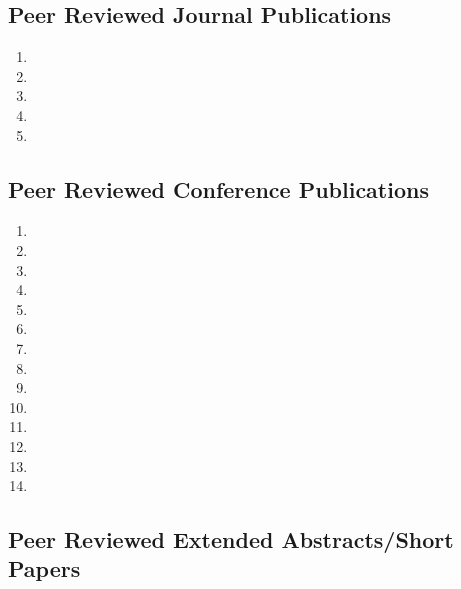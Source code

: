 
\hypertarget{peer-reviewed-journal-publications}{%
\subsection{Peer Reviewed Journal
Publications}\label{peer-reviewed-journal-publications}}

\begin{enumerate}
\tightlist
\item {}
\item {}
\item {}
\item {}
\item {}
\end{enumerate}

\hypertarget{peer-reviewed-conference-publications}{%
\subsection{Peer Reviewed Conference
Publications}\label{peer-reviewed-conference-publications}}

\begin{enumerate}[resume]
\tightlist
\item {}
\item {}
\item {}
\item {}
\item {}
\item {}
\item {}
\item {}
\item {}
\item {}
\item {}
\item {}
\item {}
\item {}
\end{enumerate}

\hypertarget{peer-reviewed-extended-abstractsshort-papers}{%
\subsection{Peer Reviewed Extended Abstracts/Short
Papers}\label{peer-reviewed-extended-abstractsshort-papers}}


